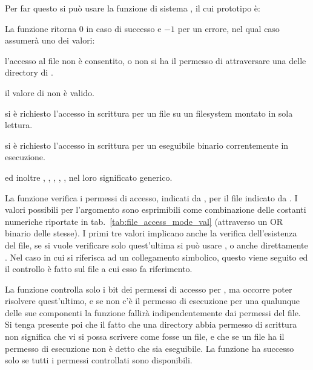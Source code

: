 Per far questo si può usare la funzione di sistema , il cui
prototipo è:

\begin{funcproto}{
}

{La funzione ritorna $0$ in caso di successo e $-1$ per un errore, nel qual
  caso  assumerà uno dei valori: 
  \begin{errlist} 
  \item[\errcode{EACCES}] l'accesso al file non è consentito, o non si ha il
    permesso di attraversare una delle directory di .
  \item[\errcode{EINVAL}] il valore di  non è valido.
  \item[\errcode{EROFS}] si è richiesto l'accesso in scrittura per un file su
    un filesystem montato in sola lettura.
  \item[\errcode{ETXTBSY}] si è richiesto l'accesso in scrittura per un
    eseguibile binario correntemente in esecuzione.
  \end{errlist}
  ed inoltre , , ,
  , ,  nel loro
  significato generico.}
\end{funcproto}

La funzione verifica i permessi di accesso, indicati da , per il
file indicato da . I valori possibili per l'argomento
 sono esprimibili come combinazione delle costanti numeriche
riportate in tab.~\ref{tab:file_access_mode_val} (attraverso un OR binario
delle stesse). I primi tre valori implicano anche la verifica dell'esistenza
del file, se si vuole verificare solo quest'ultima si può usare ,
o anche direttamente . Nel caso in cui  si
riferisca ad un collegamento simbolico, questo viene seguito ed il controllo è
fatto sul file a cui esso fa riferimento.

La funzione controlla solo i bit dei permessi di accesso per ,
ma occorre poter risolvere quest'ultimo, e se non c'è il permesso di
esecuzione per una qualunque delle sue componenti la funzione fallirà
indipendentemente dai permessi del file.  Si tenga presente poi che il fatto
che una directory abbia permesso di scrittura non significa che vi si possa
scrivere come fosse un file, e che se un file ha il permesso di esecuzione non
è detto che sia eseguibile. La funzione ha successo solo se tutti i permessi
controllati sono disponibili.

